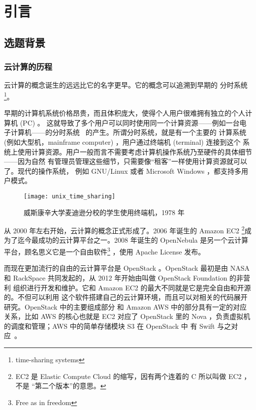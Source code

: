 \chapter{引言}
\label{cha:intro}

\section{选题背景}

\subsection{云计算的历程}
\label{subsec:history-of-cloud}

云计算的概念诞生的远远比它的名字更早。它的概念可以追溯到早期的
分时系统\footnote{time-sharing systems}。

早期的计算机系统价格昂贵，而且体积庞大，使得个人用户很难拥有独立的个人计算机 (PC) 。
这就导致了多个用户可以同时使用同一个计算资源——例如一台电子计算机——的分时系统
~\cite{timesharing}的产生。所谓分时系统，就是有一个主要的
计算系统 (例如大型机，mainframe computer) ，用户通过终端机 (terminal) 连接到这个
系统上使用计算资源。用户一般而言不需要考虑计算机操作系统乃至硬件的具体细节——因为自然
有管理员管理这些细节，只需要像“租客”一样使用计算资源就可以了。现代的操作系统，
例如 GNU/Linux 或者 Microsoft Windows ，都支持多用户模式。

\begin{figure}[h]
    \centering
    \texttt{[image: unix\_time\_sharing]}
    \caption{威斯康辛大学麦迪逊分校的学生使用终端机，1978 年}
\end{figure}

从 2000 年左右开始，云计算的概念正式形成了。2006 年诞生的 Amazon EC2 \footnote{EC2
  是 Elastic Compute Cloud 的缩写，因有两个连着的 C 所以叫做 EC2 ，不是
  “第二个版本”的意思。}成为了迄今最成功的云计算平台之一。2008 年诞生的 OpenNebula
是另一个云计算平台，顾名思义它是一个自由软件\footnote{Free as in freedom}
，使用 Apache License 发布。

而现在更加流行的自由的云计算平台是 OpenStack 。OpenStack 最初是由
 NASA 和 RackSpace 共同发起的，从 2012 年开始由叫做 OpenStack Foundation 的非营利
组织进行开发和维护。它和 Amazon EC2 的最大不同就是它是完全自由和开源的。不但可以利用
这个软件搭建自己的云计算环境，而且可以对相关的代码展开研究。OpenStack 中的主要组成部分
和 Amazon AWS 中的部分具有一定的对应关系，比如 AWS 的核心也就是 EC2 对应了 OpenStack
 里的 Nova ，负责虚拟机的调度和管理；AWS 中的简单存储模块 S3 在 OpenStack 中
有 Swift 与之对应~\cite{openstack}。


